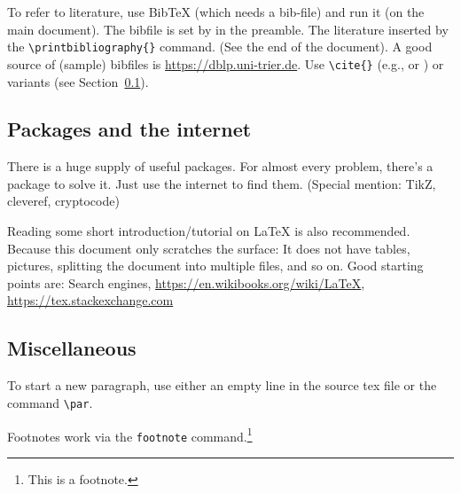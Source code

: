 \documentclass[11pt]{scrartcl}
\theoremstyle{plain} %
\theoremstyle{definition} %
\theoremstyle{remark} %
\begin{document}
To refer to literature, use BibTeX (which needs a bib-file) and run it (on the main document).
The bibfile is set by \verb|| in the preamble.
The literature inserted by the \verb|\printbibliography{}| command. (See the end of the document).
A good source of (sample) bibfiles is \url{https://dblp.uni-trier.de}.
Use \verb|\cite{}| (e.g., \cite{DH76} or \cite{RSA78}) or variants (see Section~\ref{subsec:packages}).


\subsection{Packages and the internet}
\label{subsec:packages}

There is a huge supply of useful packages.
For almost every problem, there's a package to solve it.
Just use the internet to find them.
(Special mention: TikZ, cleveref, cryptocode)

Reading some short introduction/tutorial on \LaTeX{} is also recommended.
Because this document only scratches the surface:
It does not have tables, pictures, splitting the document into multiple files, and so on.
Good starting points are:
Search engines, \url{https://en.wikibooks.org/wiki/LaTeX}, \url{https://tex.stackexchange.com}



\subsection{Miscellaneous}
\label{subsec:misc}

To start a new paragraph, use either an empty line in the source tex file or the command \verb|\par|.

Footnotes work via the \verb|footnote| command.\footnote{This is a footnote.}





\printbibliography{}
\end{document}
